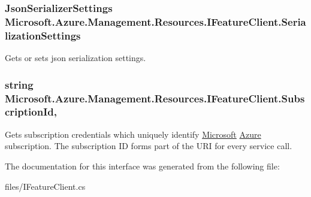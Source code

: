 \subsubsection[{\texorpdfstring{Serialization\+Settings}{SerializationSettings}}]{\setlength{\rightskip}{0pt plus 5cm}Json\+Serializer\+Settings Microsoft.\+Azure.\+Management.\+Resources.\+I\+Feature\+Client.\+Serialization\+Settings\hspace{0.3cm}{\ttfamily [get]}}\hypertarget{interface_microsoft_1_1_azure_1_1_management_1_1_resources_1_1_i_feature_client_a2a98d523ce76fdf9ae319bf310e6a4a9}{}\label{interface_microsoft_1_1_azure_1_1_management_1_1_resources_1_1_i_feature_client_a2a98d523ce76fdf9ae319bf310e6a4a9}


Gets or sets json serialization settings. 

\subsubsection[{\texorpdfstring{Subscription\+Id}{SubscriptionId}}]{\setlength{\rightskip}{0pt plus 5cm}string Microsoft.\+Azure.\+Management.\+Resources.\+I\+Feature\+Client.\+Subscription\+Id\hspace{0.3cm}{\ttfamily [get]}, {\ttfamily [set]}}\hypertarget{interface_microsoft_1_1_azure_1_1_management_1_1_resources_1_1_i_feature_client_ac47fd4a6f6356b38a291881ef7f7306f}{}\label{interface_microsoft_1_1_azure_1_1_management_1_1_resources_1_1_i_feature_client_ac47fd4a6f6356b38a291881ef7f7306f}


Gets subscription credentials which uniquely identify \hyperlink{namespace_microsoft}{Microsoft} \hyperlink{namespace_microsoft_1_1_azure}{Azure} subscription. The subscription ID forms part of the U\+RI for every service call. 



The documentation for this interface was generated from the following file\+:\begin{DoxyCompactItemize}
\item 
files/I\+Feature\+Client.\+cs\end{DoxyCompactItemize}
